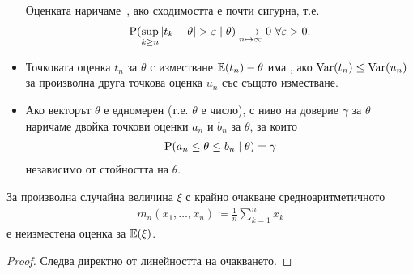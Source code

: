 \documentclass[numbers=endperiod, bibliography=totocnumbered]{scrartcl}
\begin{document}
\begin{definition}[Оценки]
\begin{itemize}
    Оценката наричаме~, ако сходимостта е почти сигурна, т.е.
    \begin{align*}
      \operatorname{P}(\sup_{k \geq n} \left\vert t_k - \theta \right\vert > \varepsilon \mid \theta) \underset {n \mapsto \infty} \longrightarrow 0~\forall \varepsilon > 0.
    \end{align*}

    \item Точковата оценка \( t_n \) за \( \theta \) с изместване \( \mathbb{E}(t_n) - \theta \) има , ако \( \operatorname{Var}(t_n) \leq \operatorname{Var}(u_n) \) за произволна друга точкова оценка \( u_n \) със същото изместване.

    \item Ако векторът \( \theta \) е едномерен (т.е. \( \theta \) е число),  с ниво на доверие \( \gamma \) за \( \theta \) наричаме двойка точкови оценки \( a_n \) и \( b_n \) за \( \theta \), за които
    \begin{align*}
      \operatorname{P}(a_n \leq \theta \leq b_n \mid \theta) = \gamma
    \end{align*}
    независимо от стойността на \( \theta \).
  \end{itemize}
\end{definition}

\begin{proposition}\label{thm:unbiased-mean}
  За произволна случайна величина \( \xi \) с крайно очакване средноаритметичното
  \begin{align*}
    m_n(x_1, \ldots, x_n) \coloneqq \frac 1 n \sum_{k=1}^n x_k
  \end{align*}
  е неизместена оценка за \( \mathbb{E}(\xi) \).
\end{proposition}
\begin{proof}
  Следва директно от линейността на очакването.
\end{proof}
\end{document}

